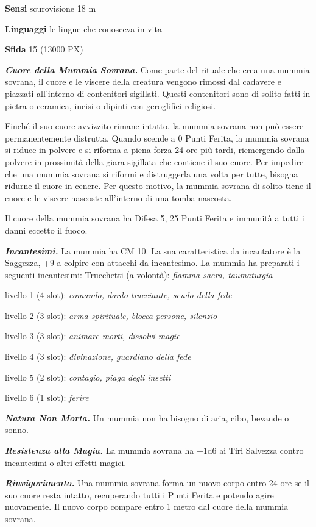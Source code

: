 \begin{multicols}{2}
\textbf{Sensi} scurovisione 18 m

\textbf{Linguaggi} le lingue che conosceva in vita

\textbf{Sfida} 15 (13000 PX)

\textit{\textbf{Cuore della Mummia Sovrana.}} Come parte del rituale che crea una mummia sovrana, il cuore e le viscere della creatura vengono rimossi dal cadavere e piazzati all'interno di contenitori sigillati. Questi contenitori sono di solito fatti in pietra o ceramica, incisi o dipinti con geroglifici religiosi.

Finché il suo cuore avvizzito rimane intatto, la mummia sovrana non può essere permanentemente distrutta. Quando scende a 0 Punti Ferita, la mummia sovrana si riduce in polvere e si riforma a piena forza 24 ore più tardi, riemergendo dalla polvere in prossimità della giara sigillata che contiene il suo cuore. Per impedire che una mummia sovrana si riformi e distruggerla una volta per tutte, bisogna ridurne il cuore in cenere. Per questo motivo, la mummia sovrana di solito tiene il cuore e le viscere nascoste all'interno di una tomba nascosta.

Il cuore della mummia sovrana ha Difesa 5, 25 Punti Ferita e immunità a tutti i danni eccetto il fuoco.

\textit{\textbf{Incantesimi.}} La mummia ha CM 10. La sua caratteristica da incantatore è la Saggezza, +9 a colpire con attacchi da incantesimo. La mummia ha preparati i seguenti incantesimi: Trucchetti (a volontà): \textit{fiamma sacra, taumaturgia}

livello 1 (4 slot): \textit{comando, dardo tracciante, scudo della fede}

livello 2 (3 slot): \textit{arma spirituale, blocca persone, silenzio}

livello 3 (3 slot): \textit{animare morti, dissolvi magie}

livello 4 (3 slot): \textit{divinazione, guardiano della fede}

livello 5 (2 slot): \textit{contagio, piaga degli insetti}

livello 6 (1 slot): \textit{ferire}

\textit{\textbf{Natura Non Morta.}} Un mummia non ha bisogno di aria, cibo, bevande o sonno.

\textit{\textbf{Resistenza alla Magia.}} La mummia sovrana ha +1d6 ai Tiri Salvezza contro incantesimi o altri effetti magici.

\textit{\textbf{Rinvigorimento.}} Una mummia sovrana forma un nuovo corpo entro 24 ore se il suo cuore resta intatto, recuperando tutti i Punti Ferita e potendo agire nuovamente. Il nuovo corpo compare entro 1 metro dal cuore della mummia sovrana.


\end{multicols}
